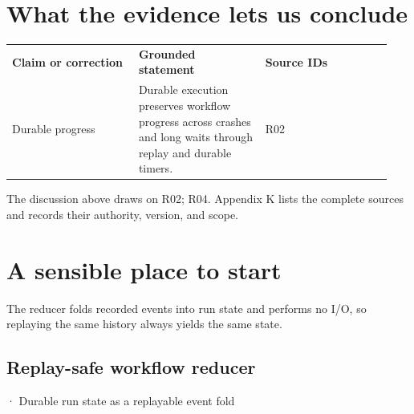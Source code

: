 \section{What the evidence lets us conclude}

\BookTableStart
\small
\begin{tabular}{@{}Y{0.3133\linewidth}Y{0.3133\linewidth}Y{0.3133\linewidth}@{}}
\color{white}\bfseries \textbf{Claim or correction} & \color{white}\bfseries \textbf{Grounded statement} & \color{white}\bfseries \textbf{Source IDs} \\
Durable progress & Durable execution preserves workflow progress across crashes and long waits through replay and durable timers. & R02 \\
\end{tabular}
\BookTableEnd

The discussion above draws on R02; R04. Appendix K lists the complete sources and records their authority, version, and scope.\par

\section{A sensible place to start}

The reducer folds recorded events into run state and performs no I/O, so replaying the same history always yields the same state.\par

\subsection{Replay-safe workflow reducer}

\BookSnake · Durable run state as a replayable event fold\par

